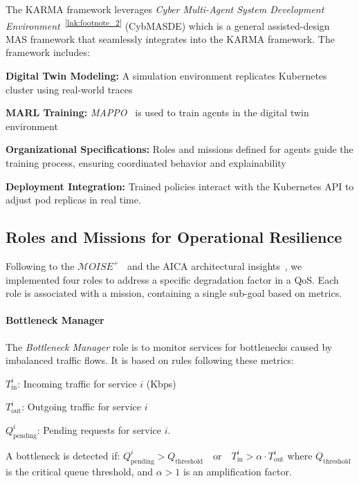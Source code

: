 The KARMA framework leverages \textit{Cyber Multi-Agent System Development Environment}~\textsuperscript{\ref{lnk:footnote_2}} (CybMASDE) which is a general assisted-design MAS framework that seamlessly integrates into the KARMA framework.
The framework includes:
\begin{enumerate*}[label=\textbf{\arabic*)}, itemjoin={;\quad }]
  \item \textbf{Digital Twin Modeling:} A simulation environment replicates Kubernetes cluster using real-world traces
  \item \textbf{MARL Training:} \textit{MAPPO}~\cite{Yu2022} is used to train agents in the digital twin environment
  \item \textbf{Organizational Specifications:} Roles and missions defined for agents guide the training process, ensuring coordinated behavior and explainability
  \item \textbf{Deployment Integration:} Trained policies interact with the Kubernetes API to adjust pod replicas in real time.
\end{enumerate*}

\subsection{Roles and Missions for Operational Resilience}

\noindent Following to the $\mathcal{M}OISE^+$~\cite{hubner2002moise} and the AICA architectural insights~\cite{kott2018autonomous}, we implemented four roles to address a specific degradation factor in a QoS.
Each role is associated with a mission, containing a single sub-goal based on metrics.

\noindent \paragraph{\textbf{Bottleneck Manager}}
%
The \textit{Bottleneck Manager} role is to monitor services for bottlenecks caused by imbalanced traffic flows. It is based on rules following these metrics:
\begin{enumerate*}[label={}, itemjoin={;\quad }]
  \item \( T_{\text{in}}^i \): Incoming traffic for service \( i \) (Kbps)
  \item \( T_{\text{out}}^i \): Outgoing traffic for service \( i \)
  \item \( Q_{\text{pending}}^i \): Pending requests for service \( i \).
\end{enumerate*}
A bottleneck is detected if: $Q_{\text{pending}}^i > Q_{\text{threshold}} \quad \text{or} \quad T_{\text{in}}^i > \alpha \cdot T_{\text{out}}^i$
where \( Q_{\text{threshold}} \) is the critical queue threshold, and \( \alpha > 1 \) is an amplification factor.

